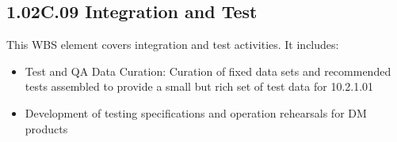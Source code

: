 \subsection{1.02C.09 Integration and Test}

This WBS element covers integration and test activities. It includes:

\begin{itemize}

\item{Test and QA Data Curation: Curation of fixed data sets and
  recommended tests assembled to provide a small but rich set of test
  data for 10.2.1.01}
  
\item{Development of testing specifications and operation rehearsals
    for DM products}
    
\end{itemize}


